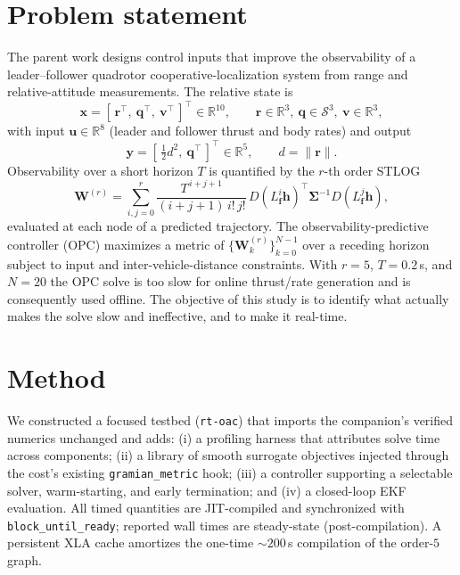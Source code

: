 \documentclass[11pt]{article}
\newcommand{\stlog}{\mathbf{W}^{(r)}}
\newcommand{\xs}{\mathbf{x}}
\newcommand{\us}{\mathbf{u}}
\newcommand{\ys}{\mathbf{y}}
\begin{document}
\section{Problem statement}

The parent work designs control inputs that improve the observability of a leader--follower
quadrotor cooperative-localization system from range and relative-attitude measurements. The
relative state is
\[
\xs = [\,\mathbf{r}^\top,\ \mathbf{q}^\top,\ \mathbf{v}^\top\,]^\top \in \mathbb{R}^{10},
\qquad \mathbf{r}\in\mathbb{R}^3,\ \mathbf{q}\in\mathcal{S}^3,\ \mathbf{v}\in\mathbb{R}^3,
\]
with input $\us\in\mathbb{R}^8$ (leader and follower thrust and body rates) and output
\[
\ys = \left[\,\tfrac{1}{2}d^2,\ \mathbf{q}^\top\,\right]^\top \in \mathbb{R}^5,
\qquad d=\lVert\mathbf{r}\rVert .
\]
Observability over a short horizon $T$ is quantified by the $r$-th order STLOG
\begin{equation}
\stlog = \sum_{i,j=0}^{r}\frac{T^{\,i+j+1}}{(i+j+1)\,i!\,j!}
\, D\!\left(L_\mathbf{f}^i \mathbf{h}\right)^{\!\top} \boldsymbol{\Sigma}^{-1}
D\!\left(L_\mathbf{f}^j \mathbf{h}\right),
\label{eq:stlog}
\end{equation}
evaluated at each node of a predicted trajectory. The observability-predictive controller
(OPC) maximizes a metric of $\{\stlog_k\}_{k=0}^{N-1}$ over a receding horizon subject to
input and inter-vehicle-distance constraints. With $r=5$, $T=0.2$\,s, and $N=20$ the OPC
solve is too slow for online thrust/rate generation and is consequently used offline. The
objective of this study is to identify what actually makes the solve slow and ineffective,
and to make it real-time.

\section{Method}

We constructed a focused testbed (\texttt{rt-oac}) that imports the companion's verified
numerics unchanged and adds: (i) a profiling harness that attributes solve time across
components; (ii) a library of smooth surrogate objectives injected through the cost's existing
\texttt{gramian\_metric} hook; (iii) a controller supporting a selectable solver,
warm-starting, and early termination; and (iv) a closed-loop EKF evaluation. All timed
quantities are JIT-compiled and synchronized with \texttt{block\_until\_ready}; reported wall
times are steady-state (post-compilation). A persistent XLA cache amortizes the one-time
${\sim}200$\,s compilation of the order-$5$ graph.
\end{document}
